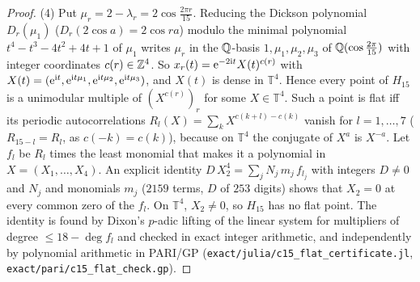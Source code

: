 \begin{proof}
(4) Put $\mu_r=2-\lambda_r=2\cos\frac{2\pi r}{15}$. Reducing the Dickson polynomial $D_r(\mu_1)$
($D_r(2\cos a)=2\cos ra$) modulo the minimal polynomial $t^4-t^3-4t^2+4t+1$ of $\mu_1$ writes $\mu_r$ in the
$\mathbb{Q}$-basis $1,\mu_1,\mu_2,\mu_3$ of $\mathbb{Q}(\cos\frac{2\pi}{15})$ with integer coordinates $c(r)\in\mathbb{Z}^4$. So
$x_r(t)=\mathrm{e}^{-2\mathrm it}X(t)^{c(r)}$ with $X(t)=(\mathrm{e}^{\mathrm it},\mathrm{e}^{\mathrm it\mu_1},\mathrm{e}^{\mathrm it\mu_2},
\mathrm{e}^{\mathrm it\mu_3})$, and $X(t)$ is dense in $\mathbb T^4$. Hence every point of $H_{15}$ is a unimodular
multiple of $(X^{c(r)})_r$ for some $X\in\mathbb T^4$. Such a point is flat iff its periodic autocorrelations
$R_l(X)=\sum_kX^{c(k+l)-c(k)}$ vanish for $l=1,\dots,7$ ($R_{15-l}=R_l$, as $c(-k)=c(k)$), because on
$\mathbb T^4$ the conjugate of $X^a$ is $X^{-a}$. Let $f_l$ be $R_l$ times the least monomial that makes it
a polynomial in $X=(X_1,\dots,X_4)$. An explicit identity $D\,X_2^4=\sum_jN_j\,m_j\,f_{l_j}$ with integers $D\ne0$ and $N_j$ and monomials $m_j$
($2159$ terms, $D$ of $253$ digits) shows that $X_2=0$ at every common zero of the $f_l$. On $\mathbb T^4$,
$X_2\ne0$, so $H_{15}$ has no flat point. The identity is found by Dixon's $p$-adic lifting of the linear system
for multipliers of degree $\le18-\deg f_l$ and checked in exact integer arithmetic, and independently by polynomial
arithmetic in PARI/GP (\texttt{exact/julia/c15\_flat\_certificate.jl}, \texttt{exact/pari/c15\_flat\_check.gp}).


\end{proof}
